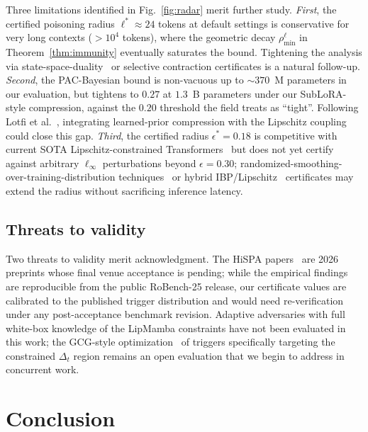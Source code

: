 \documentclass[journal,a4paper,10pt]{IEEEtran}
\theoremstyle{definition}
\theoremstyle{remark}
\newcommand{\modelname}{LipMamba}
\begin{document}
Three limitations identified in Fig.~\ref{fig:radar} merit further study. \emph{First}, the certified poisoning radius $\ell^* \approx 24$ tokens at default settings is conservative for very long contexts ($> 10^4$ tokens), where the geometric decay $\rho_{\min}^\ell$ in Theorem~\ref{thm:immunity} eventually saturates the bound. Tightening the analysis via state-space-duality~\cite{dao2024mamba2} or selective contraction certificates is a natural follow-up. \emph{Second}, the PAC-Bayesian bound is non-vacuous up to $\sim$$370$~M parameters in our evaluation, but tightens to $0.27$ at $1.3$~B parameters under our SubLoRA-style compression, against the $0.20$ threshold the field treats as ``tight''. Following Lotfi et al.~\cite{lotfi2024nonvacuous}, integrating learned-prior compression with the Lipschitz coupling could close this gap. \emph{Third}, the certified radius $\epsilon^* = 0.18$ is competitive with current SOTA Lipschitz-constrained Transformers~\cite{newhouse2025lipschitz} but does not yet certify against arbitrary $\ell_\infty$ perturbations beyond $\epsilon = 0.30$; randomized-smoothing-over-training-distribution techniques~\cite{rosenfeld2020certified} or hybrid IBP/Lipschitz~\cite{shi2020robustness} certificates may extend the radius without sacrificing inference latency.

\subsection{Threats to validity}

Two threats to validity merit acknowledgment. The HiSPA papers~\cite{lemercier2026hispa,lemercier2026clasp,lemercier2026spectralguard} are 2026 preprints whose final venue acceptance is pending; while the empirical findings are reproducible from the public RoBench-25 release, our certificate values are calibrated to the published trigger distribution and would need re-verification under any post-acceptance benchmark revision. Adaptive adversaries with full white-box knowledge of the \modelname{} constraints have not been evaluated in this work; the GCG-style optimization~\cite{zou2023universal} of triggers specifically targeting the constrained $\Delta_t$ region remains an open evaluation that we begin to address in concurrent work.


\section{Conclusion}
\label{sec:conclusion}
\end{document}
